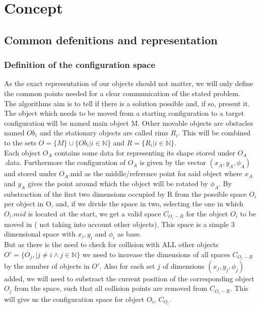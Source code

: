 \chapter{Concept}
\section{Common defenitions and representation}
\subsection{Definition of the configuration space}
As the exact representation of our objects should not matter, we will only define the common points needed for a clear communication of the stated problem.\\
The algorithms aim is to tell if there is a solution possible and, if so, present it. The object which needs to be moved from a starting configuration to a target configuration will be named main object M. Other movable objects are obstacles named $Ob_i$  and the stationary objects are called rims $R_i$. This will be combined to the sets $O = \{M\}  \cup \{Ob_i | i \in \mathbb{N} \} $ and $ R = \{ R_i | i \in \mathbb{N}\}$.\\

Each object $O_A$ contains some data for representing its shape stored under $O_A$.data. Furthermore the configuration of $O_A$ is given by the vector $(x_A,y_A,\phi_A)$ and stored under $O_A$.mid as the middle/reference point for said object where $x_A$ and $y_A$ gives the point around which the object will be rotated by $\phi_A$.
By substraction of the first two dimensions occupied by R from the possible space $O_i$ per object in O, and, if we divide the space in two, selecting the one in which $O_i.mid$ is located at the start, we get a valid space $C_{O_i-R}$ for the object $O_i$ to be moved in ( not taking into account other objects). This space is a simple 3 dimensional space with $x_i, y_i$ and $\phi_i$ as base.\\
But as there is the need to check for collision with ALL other objects $O' = \{O_j, | j\neq i \wedge j \in \mathbb{N}\} $ we need to increase the dimensions of all spaces $C_{O_i-R}$ by the number of objects in $O'$. Also for each set $j$ of dimensions $(x_j,y_j,\phi_j)$  added, we will need to substract the current position of the corresponding object $O_j$ from the space, such that all collision points are removed from $C_{O_i-R}$. This will give us the configuration space for object $O_i$, $C_{O_i}$.


